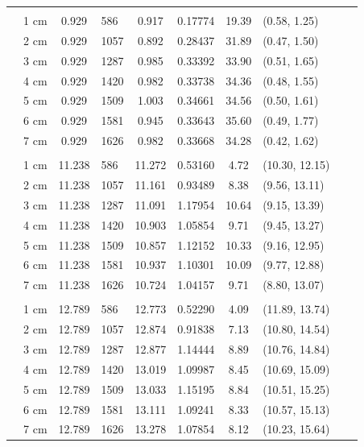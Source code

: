 \documentclass[a4paper 12pt]{article}
\numberwithin{equation}{section}
\begin{document}
\begin{small}
\begin{table}[h!]
\begin{footnotesize}
\begin{tabular}{clclclclcl}
\raisebox{1ex}{\bf age 2} &  \\ [1.0ex]
&   1 cm & 0.929 &  586 &  0.917  &          0.17774& 19.39 & (0.58, 1.25)\\
&   2 cm & 0.929 &  1057&  0.892  &          0.28437& 31.89 & (0.47, 1.50) \\
&   3 cm & 0.929 &  1287&  0.985  &          0.33392& 33.90 & (0.51, 1.65)\\
&   4 cm & 0.929 &  1420&  0.982  &          0.33738& 34.36 & (0.48, 1.55)\\
&   5 cm & 0.929 &  1509&  1.003  &          0.34661& 34.56 & (0.50, 1.61)\\
&   6 cm & 0.929 &  1581&  0.945  &          0.33643& 35.60 & (0.49, 1.77)\\
&   7 cm & 0.929 &  1626&  0.982  &          0.33668& 34.28 & (0.42, 1.62)\\[1.2ex]

 \raisebox{1ex}{\bf age 3} \\ [1.0ex]
&   1 cm & 11.238  & 586 & 11.272 &           0.53160& 4.72  & (10.30, 12.15)\\
&   2 cm & 11.238  & 1057& 11.161 &           0.93489& 8.38  & (9.56, 13.11)\\
&   3 cm & 11.238  & 1287& 11.091 &           1.17954& 10.64 & (9.15, 13.39)\\
&   4 cm & 11.238  & 1420& 10.903 &           1.05854& 9.71  & (9.45, 13.27)\\
&   5 cm & 11.238  & 1509& 10.857 &           1.12152& 10.33 & (9.16, 12.95)\\
&   6 cm & 11.238  & 1581& 10.937 &           1.10301& 10.09 & (9.77, 12.88)\\
&   7 cm & 11.238  & 1626& 10.724 &           1.04157& 9.71  & (8.80, 13.07)\\[1.5ex]

 \raisebox{1ex}{\bf age 4} &  \\ [1.0ex]
 &  1 cm & 12.789 &  586 & 12.773 &           0.52290& 4.09 & (11.89, 13.74) \\
 &  2 cm & 12.789 &  1057& 12.874 &           0.91838& 7.13 & (10.80, 14.54) \\
 &  3 cm & 12.789 &  1287& 12.877 &           1.14444& 8.89 & (10.76, 14.84) \\
 &  4 cm & 12.789 &  1420& 13.019 &           1.09987& 8.45 & (10.69, 15.09) \\
 &  5 cm & 12.789 &  1509& 13.033 &           1.15195& 8.84 & (10.51, 15.25) \\
 &  6 cm & 12.789 &  1581& 13.111 &           1.09241& 8.33 & (10.57, 15.13) \\
 &  7 cm & 12.789 &  1626& 13.278 &           1.07854& 8.12 & (10.23, 15.64) \\[1.2ex]


\end{tabular}
\end{footnotesize}
\end{table}
\end{small}
\end{document}
